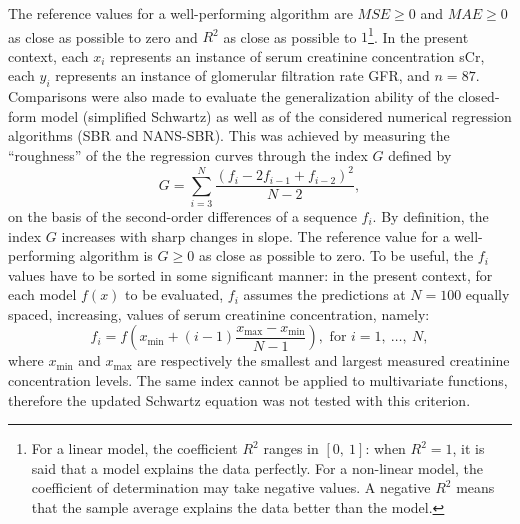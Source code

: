 \documentclass[10pt,final]{siamltex}
\begin{document}
The reference values for a well-performing algorithm are $\textit{MSE}\geq 0$ and $\textit{MAE}\geq 0$ as close as possible to zero and $R^2$ as close as possible to $1$\footnote{For a linear model, the coefficient $R^2$ ranges in $[0,\ 1]$: when $R^2=1$, it is said that a model explains the data perfectly. For a non-linear model, the coefficient of determination may take negative values. A negative $R^2$ means that the sample average explains the data better than the model.}.
In the present context, each $x_i$ represents an instance of serum creatinine concentration sCr, each $y_i$ represents an instance of glomerular filtration rate GFR, and $n = 87$.
Comparisons were also made to evaluate the generalization ability of the closed-form model (simplified Schwartz) as well as of the considered numerical regression algorithms (SBR and NANS-SBR).
This was achieved by measuring the ``roughness'' of the the regression curves through the index $G$ defined by
%
\begin{equation}
  G = \sum_{i=3}^{N}{\frac{(f_i-2f_{i-1}+f_{i-2})^2}{N-2}},
\end{equation}
%
on the basis of the second-order differences of a sequence $f_i$. By definition, the index $\textit{G}$ increases with sharp changes in slope. The reference value for a well-performing algorithm is $G\geq 0$ as close as possible to zero. To be useful, the $f_i$ values have to be sorted in some significant manner: in the present context, for each model $f(x)$ to be evaluated, $f_i$ assumes the predictions at $N = 100$ equally spaced, increasing, values of serum creatinine concentration, namely:
%
\begin{equation}\label{eqn_sampl}
  f_i = f\left(x_\mathrm{min} + (i-1)\frac{x_\mathrm{max}-x_\mathrm{min}}{N-1}\right), \text{ for } i = 1,\ \ldots,\ N,
\end{equation}
%
where $x_\mathrm{min}$ and $x_\mathrm{max}$ are respectively the smallest and largest measured creatinine concentration levels. The same index cannot be applied to multivariate functions, therefore the updated Schwartz equation was not tested with this criterion.
%
\end{document}

